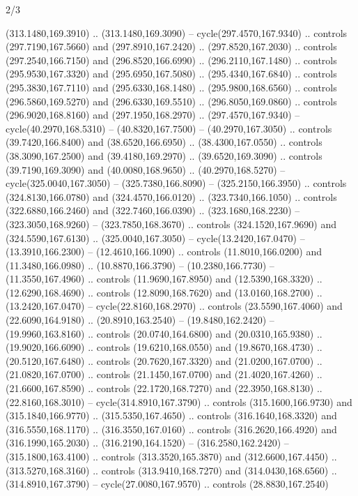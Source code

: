 \begin{flagdescription}{2/3}
\begin{scope}[xshift=0.5\flaglength,yshift=0.5\flagwidth,scale=\stretchfactor]
\begin{scope}[scale=0.001645\flagwidth,yshift=65mm,xshift=-63mm]
\begin{scope}[y=0.80pt, x=0.80pt, yscale=-1,]
\begin{scope}[cm={{1.33333,0.0,0.0,1.33333,(0.0,1e-05)}}]
  (313.1480,169.3910) .. (313.1480,169.3090) -- cycle(297.4570,167.9340) ..
  controls (297.7190,167.5660) and (297.8910,167.2420) .. (297.8520,167.2030) ..
  controls (297.2540,166.7150) and (296.8520,166.6990) .. (296.2110,167.1480) ..
  controls (295.9530,167.3320) and (295.6950,167.5080) .. (295.4340,167.6840) ..
  controls (295.3830,167.7110) and (295.6330,168.1480) .. (295.9800,168.6560) ..
  controls (296.5860,169.5270) and (296.6330,169.5510) .. (296.8050,169.0860) ..
  controls (296.9020,168.8160) and (297.1950,168.2970) .. (297.4570,167.9340) --
  cycle(40.2970,168.5310) -- (40.8320,167.7500) -- (40.2970,167.3050) ..
  controls (39.7420,166.8400) and (38.6520,166.6950) .. (38.4300,167.0550) ..
  controls (38.3090,167.2500) and (39.4180,169.2970) .. (39.6520,169.3090) ..
  controls (39.7190,169.3090) and (40.0080,168.9650) .. (40.2970,168.5270) --
  cycle(325.0040,167.3050) -- (325.7380,166.8090) -- (325.2150,166.3950) ..
  controls (324.8130,166.0780) and (324.4570,166.0120) .. (323.7340,166.1050) ..
  controls (322.6880,166.2460) and (322.7460,166.0390) .. (323.1680,168.2230) --
  (323.3050,168.9260) -- (323.7850,168.3670) .. controls (324.1520,167.9690) and
  (324.5590,167.6130) .. (325.0040,167.3050) -- cycle(13.2420,167.0470) --
  (13.3910,166.2300) -- (12.4610,166.1090) .. controls (11.8010,166.0200) and
  (11.3480,166.0980) .. (10.8870,166.3790) -- (10.2380,166.7730) --
  (11.3550,167.4960) .. controls (11.9690,167.8950) and (12.5390,168.3320) ..
  (12.6290,168.4690) .. controls (12.8090,168.7620) and (13.0160,168.2700) ..
  (13.2420,167.0470) -- cycle(22.8160,168.2970) .. controls (23.5590,167.4060)
  and (22.6090,164.9180) .. (20.8910,163.2540) -- (19.8480,162.2420) --
  (19.9960,163.8160) .. controls (20.0740,164.6800) and (20.0310,165.9380) ..
  (19.9020,166.6090) .. controls (19.6210,168.0550) and (19.8670,168.4730) ..
  (20.5120,167.6480) .. controls (20.7620,167.3320) and (21.0200,167.0700) ..
  (21.0820,167.0700) .. controls (21.1450,167.0700) and (21.4020,167.4260) ..
  (21.6600,167.8590) .. controls (22.1720,168.7270) and (22.3950,168.8130) ..
  (22.8160,168.3010) -- cycle(314.8910,167.3790) .. controls (315.1600,166.9730)
  and (315.1840,166.9770) .. (315.5350,167.4650) .. controls (316.1640,168.3320)
  and (316.5550,168.1170) .. (316.3550,167.0160) .. controls (316.2620,166.4920)
  and (316.1990,165.2030) .. (316.2190,164.1520) -- (316.2580,162.2420) --
  (315.1800,163.4100) .. controls (313.3520,165.3870) and (312.6600,167.4450) ..
  (313.5270,168.3160) .. controls (313.9410,168.7270) and (314.0430,168.6560) ..
  (314.8910,167.3790) -- cycle(27.0080,167.9570) .. controls (28.8830,167.2540)

\end{scope}
\end{scope}
\end{scope}
\end{scope}
\end{flagdescription}
